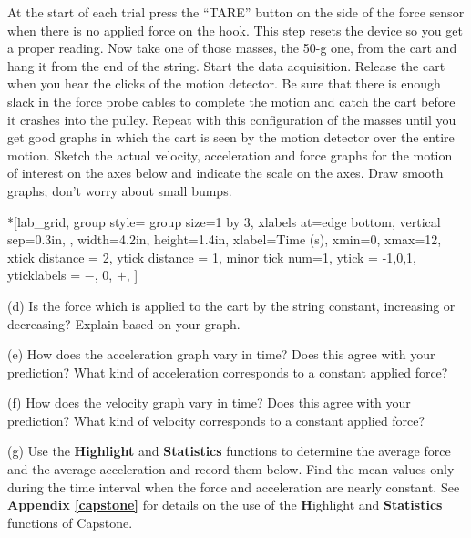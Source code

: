 At the start of each trial press the ``TARE'' button on the side of the force sensor 
when there is no applied force on the hook.
This step resets the device so you get a proper reading.
Now take one of those masses, the 50-g one, from the cart and 
hang it from the end of the string. 
Start the data acquisition.
Release the cart when you hear the clicks of the motion detector. Be sure that
there is enough slack in the force probe cables to complete the motion and catch
the cart before it crashes into the pulley. Repeat with this configuration of the
masses until you get good graphs
in which the cart is seen by the motion detector over the entire motion. Sketch
the actual velocity, acceleration and force graphs for the motion of interest
on the axes below and indicate the scale on the axes. Draw smooth graphs; don't
worry about small bumps.

\begin{lab_groupplot}*{}[lab_grid,
	group style={
		group size=1 by 3,
		xlabels at=edge bottom,
		vertical sep=0.3in,
		},
	width=4.2in,  height=1.4in,
	xlabel=Time (s),
	xmin=0, xmax=12,
	xtick distance = 2, 
	ytick distance = 1, 
	minor tick num=1,
	ytick = {-1,0,1},
	yticklabels = {$-$, 0, $+$},
	]
\nextgroupplot[
	ymin=-1,ymax=1, 
	ylabel={Velocity (m/s)},
	]
\nextgroupplot[
	ymin=-1,ymax=1, 
	ylabel={Acceleration (m/s$^2$)},
	]
\nextgroupplot[
	ymin=-1,ymax=1, 
	ylabel={Force (N)},
	]
\end{lab_groupplot}

(d) Is the force which is applied to the cart by the string constant, increasing
or decreasing? Explain based on your graph.
\answerspace{15mm}

\pagebreak[2]
(e) How does the acceleration graph vary in time? Does this agree with your
prediction? What kind of acceleration corresponds to a constant applied force?
\answerspace{20mm}

(f) How does the velocity graph vary in time? Does this agree with your prediction?
What kind of velocity corresponds to a constant applied force?
\answerspace{20mm}

(g) Use the \textbf{Highlight} and \textbf{Statistics} functions to determine 
the average force and the average acceleration
and record them below. Find the mean values only during the time interval when
the force and acceleration are nearly constant. See \textbf{Appendix \ref{capstone}} for details on
the use of the \textbf Highlight and  \textbf{Statistics} functions of Capstone.
\answerspace{20mm}

